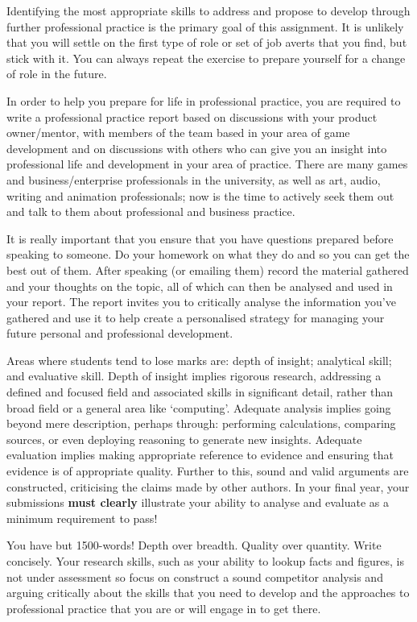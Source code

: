 \documentclass{../../fal_assignment}
\newcommand{\essayWordCount}{1500}
\begin{document}
Identifying the most appropriate skills to address and propose to develop through further professional practice is the primary goal of this assignment. It is unlikely that you will settle on the first type of role or set of job averts that you find, but stick with it. You can always repeat the exercise to prepare yourself for a change of role in the future. 

In order to help you prepare for life in professional practice, you are required to write a professional practice report based on discussions with your product owner/mentor, with members of the team based in your area of game development and on discussions with others who can give you an insight into professional life and development in your area of practice. There are many games and business/enterprise professionals in the university, as well as art, audio, writing and animation professionals; now is the time to actively seek them out and talk to them about professional and business practice.

It is really important that you ensure that you have questions prepared before speaking to someone. Do your homework on what they do and so you can get the best out of them. After speaking (or emailing them) record the material gathered and your thoughts on the topic, all of which can then be analysed and used in your report. The report invites you to critically analyse the information you've gathered and use it to help create a personalised strategy for managing your future personal and professional development.

Areas where students tend to lose marks are: depth of insight; analytical skill; and evaluative skill. Depth of insight implies rigorous research, addressing a defined and focused field and associated skills in significant detail, rather than broad field or a general area like `computing'. Adequate analysis implies going beyond mere description, perhaps through: performing calculations, comparing sources, or even deploying reasoning to generate new insights. Adequate evaluation implies making appropriate reference to evidence and ensuring that evidence is of appropriate quality. Further to this, sound and valid arguments are constructed, criticising the claims made by other authors. In your final year, your submissions \textbf{must clearly} illustrate your ability to analyse and evaluate as a minimum requirement to pass!

You have but \essayWordCount-words! Depth over breadth. Quality over quantity. Write concisely. Your research skills, such as your ability to lookup facts and figures, is not under assessment so focus on construct a sound competitor analysis and arguing critically about the skills that you need to develop and the approaches to professional practice that you are or will engage in to get there.
\end{document}
